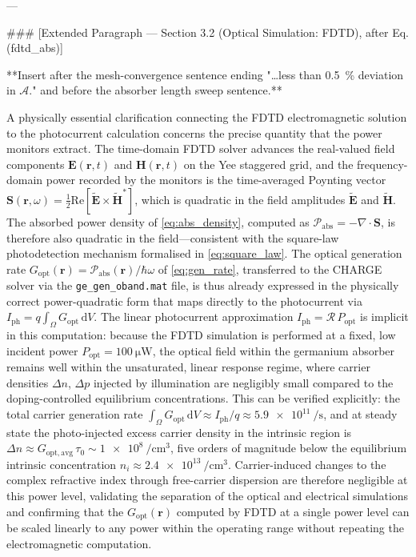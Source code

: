 ---

### [Extended Paragraph — Section 3.2 (Optical Simulation: FDTD), after Eq. (fdtd\_abs)]

**Insert after the mesh-convergence sentence ending "…less than \SI{0.5}{\percent} deviation in $\mathcal{A}$." and before the absorber length sweep sentence.**

A physically essential clarification connecting the FDTD electromagnetic solution to the photocurrent calculation concerns the precise quantity that the power monitors extract. The time-domain FDTD solver advances the real-valued field components $\mathbf{E}(\mathbf{r},t)$ and $\mathbf{H}(\mathbf{r},t)$ on the Yee staggered grid, and the frequency-domain power recorded by the monitors is the time-averaged Poynting vector $\mathbf{S}(\mathbf{r},\omega) = \tfrac{1}{2}\mathrm{Re}[\tilde{\mathbf{E}} \times \tilde{\mathbf{H}}^*]$, which is quadratic in the field amplitudes $\tilde{\mathbf{E}}$ and $\tilde{\mathbf{H}}$. The absorbed power density of \cref{eq:abs_density}, computed as $\mathcal{P}_\mathrm{abs} = -\nabla\cdot\mathbf{S}$, is therefore also quadratic in the field—consistent with the square-law photodetection mechanism formalised in \cref{eq:square_law}. The optical generation rate $G_\mathrm{opt}(\mathbf{r}) = \mathcal{P}_\mathrm{abs}(\mathbf{r})/\hbar\omega$ of \cref{eq:gen_rate}, transferred to the CHARGE solver via the \texttt{ge\_gen\_oband.mat} file, is thus already expressed in the physically correct power-quadratic form that maps directly to the photocurrent via $I_\mathrm{ph} = q\int_\Omega G_\mathrm{opt}\,\mathrm{d}V$. The linear photocurrent approximation $I_\mathrm{ph} = \mathcal{R}\,P_\mathrm{opt}$ is implicit in this computation: because the FDTD simulation is performed at a fixed, low incident power $P_\mathrm{opt} = \SI{100}{\micro\watt}$, the optical field within the germanium absorber remains well within the unsaturated, linear response regime, where carrier densities $\Delta n$, $\Delta p$ injected by illumination are negligibly small compared to the doping-controlled equilibrium concentrations. This can be verified explicitly: the total carrier generation rate $\int_\Omega G_\mathrm{opt}\,\mathrm{d}V \approx I_\mathrm{ph}/q \approx \SI{5.9e11}{\per\second}$, and at steady state the photo-injected excess carrier density in the intrinsic region is $\Delta n \approx G_\mathrm{opt,avg}\,\tau_0 \sim \SI{1e8}{\per\centi\metre\cubed}$, five orders of magnitude below the equilibrium intrinsic concentration $n_i \approx \SI{2.4e13}{\per\centi\metre\cubed}$. Carrier-induced changes to the complex refractive index through free-carrier dispersion are therefore negligible at this power level, validating the separation of the optical and electrical simulations and confirming that the $G_\mathrm{opt}(\mathbf{r})$ computed by FDTD at a single power level can be scaled linearly to any power within the operating range without repeating the electromagnetic computation.

